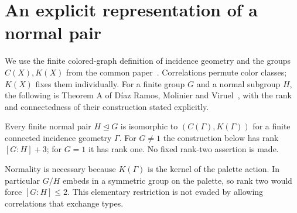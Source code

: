 \section{An explicit representation of a normal pair}
\label{sec:pairs}
We use the finite colored-graph definition of incidence geometry and the groups
$C(X),K(X)$ from the common paper~\cite{Recognition}. Correlations permute color
classes; $K(X)$ fixes them individually. For a finite group $G$ and a normal
subgroup $H$, the following is Theorem A of D\'iaz Ramos, Molinier and
Viruel~\cite{DMV}, with the rank and connectedness of their construction stated
explicitly.

\begin{theorem}\label{R.FinitePairs}
Every finite normal pair $H\mathrel{\trianglelefteq}G$ is isomorphic to
$(C(\Gamma),K(\Gamma))$ for a finite connected incidence geometry $\Gamma$.
For $G\ne1$ the construction below has rank $[G:H]+3$; for $G=1$ it has rank
one. No fixed rank-two assertion is made.
\end{theorem}

Normality is necessary because $K(\Gamma)$ is the kernel of the palette action.
In particular $G/H$ embeds in a symmetric group on the palette, so rank two
would force $[G:H]\leq2$. This elementary restriction is not evaded by
allowing correlations that exchange types.

